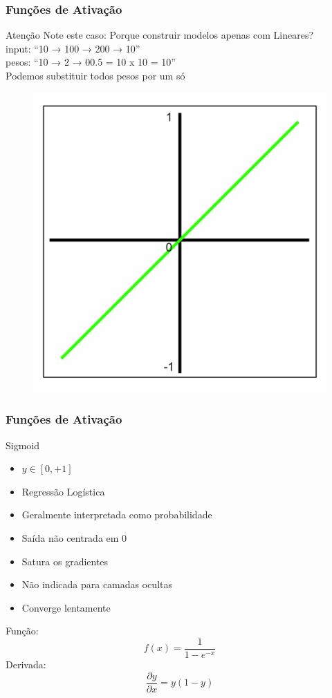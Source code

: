 \documentclass{beamer}
\begin{document}
\begin{frame}
	\frametitle{Funções de Ativação}
	\begin{alertblock}{Atenção}
		Note este caso: Porque construir modelos apenas com Lineares? \\
		input:	``10 → 100 → 200 → 10'' \\
		pesos:	``10 → 2 → 00.5 = 10 x 10 = 10'' \\
		Podemos substituir todos pesos por um só
	\end{alertblock}
	\begin{figure}
		\centering
		\includegraphics[width=0.4\linewidth]{figures/linear_function.png}
	\end{figure}
\end{frame}
\begin{frame}
	\frametitle{Funções de Ativação}
	\begin{block}{Sigmoid}
		\begin{itemize}
			\item $y \in [0, + 1]$
			\item Regressão Logística
			\item Geralmente interpretada como probabilidade
			\item Saída não centrada em $0$
			\item Satura os gradientes
			\item Não indicada para camadas ocultas
			\item Converge lentamente
		\end{itemize}
		Função:
		$$f(x) = \frac{1}{1-e^{-x}}$$
		Derivada: 	$$\frac{\partial y}{\partial x} = y(1-y)$$
	\end{block}
\end{frame}
\end{document}
